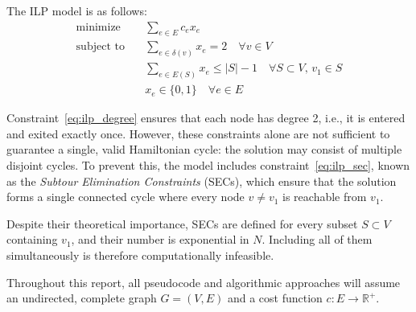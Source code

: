 The ILP model is as follows:
\begin{align}
\text{minimize} \quad & \sum_{e \in E} c_e x_e \label{eq:ilp_obj} \\
\text{subject to} \quad & \sum_{e \in \delta(v)} x_e = 2 \quad \forall v \in V \label{eq:ilp_degree} \\
& \sum_{e \in E(S)} x_e \leq |S| - 1 \quad \forall S \subset V,\, v_1 \in S \label{eq:ilp_sec} \\
& x_e \in \{0, 1\} \quad \forall e \in E \label{eq:ilp_binary}
\end{align}

Constraint~\eqref{eq:ilp_degree} ensures that each node has degree 2, i.e., it is entered and exited exactly once. 
However, these constraints alone are not sufficient to guarantee a single, valid Hamiltonian cycle: the solution may consist of multiple disjoint cycles. 
To prevent this, the model includes constraint~\eqref{eq:ilp_sec}, known as the \textit{Subtour Elimination Constraints} (SECs), 
which ensure that the solution forms a single connected cycle where every node $v \neq v_1$ is reachable from $v_1$.

Despite their theoretical importance, SECs are defined for every subset $S \subset V$ containing $v_1$, and their number is exponential in $N$. 
Including all of them simultaneously is therefore computationally infeasible.

Throughout this report, all pseudocode and algorithmic approaches will assume an undirected, complete graph $G = (V, E)$ and a cost function $c : E \rightarrow \mathbb{R}^+$.
